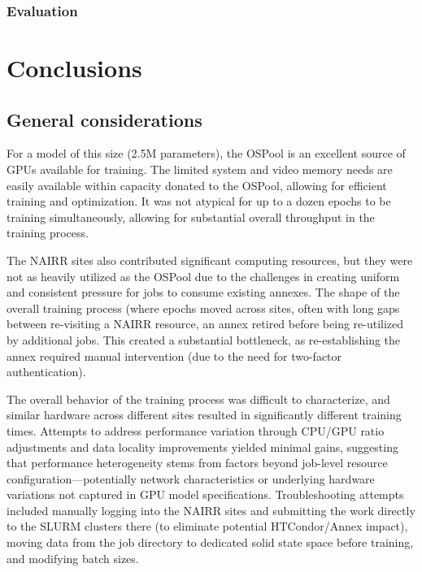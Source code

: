 \documentclass{article}
\begin{document}
\subsubsection{Evaluation}\label{results-evaluation-global}

\section{Conclusions}\label{conclusions}

\subsection{General considerations}
For a model of this size (2.5M parameters), the OSPool is an excellent source of
GPUs available for training. The limited system and video memory needs are
easily available within capacity donated to the OSPool, allowing for efficient
training and optimization. It was not atypical for up to a dozen epochs to be training simultaneously,
allowing for substantial overall throughput in the training process.

The NAIRR sites also contributed significant computing resources, but they were
not as heavily utilized as the OSPool due to the challenges in creating uniform
and consistent pressure for jobs to consume existing annexes. The shape of the
overall training process (where epochs moved across sites, often with long gaps
between re-visiting a NAIRR resource, an annex retired before being re-utilized
by additional jobs. This created a substantial bottleneck, as re-establishing
the annex required manual intervention (due to the need for two-factor
authentication).

The overall behavior of the training process was difficult to characterize, and
similar hardware across different sites resulted in significantly different
training times. Attempts to address performance variation through CPU/GPU ratio
adjustments and data locality improvements yielded minimal gains, suggesting
that performance heterogeneity stems from factors beyond job-level resource
configuration—potentially network characteristics or underlying hardware
variations not captured in GPU model specifications. Troubleshooting attempts
included manually logging into the NAIRR sites and submitting the work directly
to the SLURM clusters there (to eliminate potential HTCondor/Annex impact),
moving data from the job directory to dedicated solid state space before
training, and modifying batch sizes.
\end{document}
